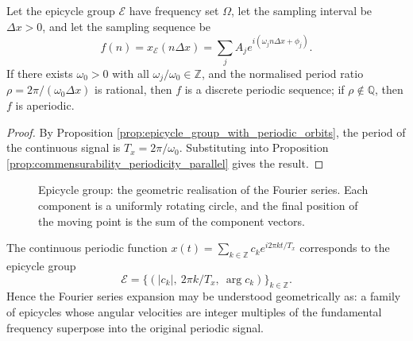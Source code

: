 \begin{proposition}\label{prop:epicycle_sampling_commensurability}
Let the epicycle group $\mathcal{E}$ have frequency set $\Omega$, let the sampling interval be $\Delta x>0$, and let the sampling sequence be
\[
f(n)=x_{\mathcal{E}}(n\Delta x)=\sum_j A_j e^{i(\omega_j n\Delta x+\phi_j)}.
\]
If there exists $\omega_0>0$ with all $\omega_j/\omega_0\in\mathbb{Z}$, and the normalised period ratio $\rho=2\pi/(\omega_0\Delta x)$ is rational, then $f$ is a discrete periodic sequence; if $\rho\notin\mathbb{Q}$, then $f$ is aperiodic.
\end{proposition}

\begin{proof}
By Proposition \ref{prop:epicycle_group_with_periodic_orbits}, the period of the continuous signal is $T_x=2\pi/\omega_0$. Substituting into Proposition \ref{prop:commensurability_periodicity_parallel} gives the result.
\end{proof}

\begin{figure}[htbp]
\centering
{}
\caption{Epicycle group: the geometric realisation of the Fourier series. Each component is a uniformly rotating circle, and the final position of the moving point is the sum of the component vectors.}
\label{fig:epicycle_system}
\end{figure}

\begin{example}\label{ex:fourier_epicycle}
The continuous periodic function $x(t)=\sum_{k\in\mathbb{Z}}c_k e^{i2\pi kt/T_x}$ corresponds to the epicycle group
\[
\mathcal{E}=\{(|c_k|,\ 2\pi k/T_x,\ \arg c_k)\}_{k\in\mathbb{Z}}.
\]
Hence the Fourier series expansion may be understood geometrically as: a family of epicycles whose angular velocities are integer multiples of the fundamental frequency superpose into the original periodic signal.
\end{example}

